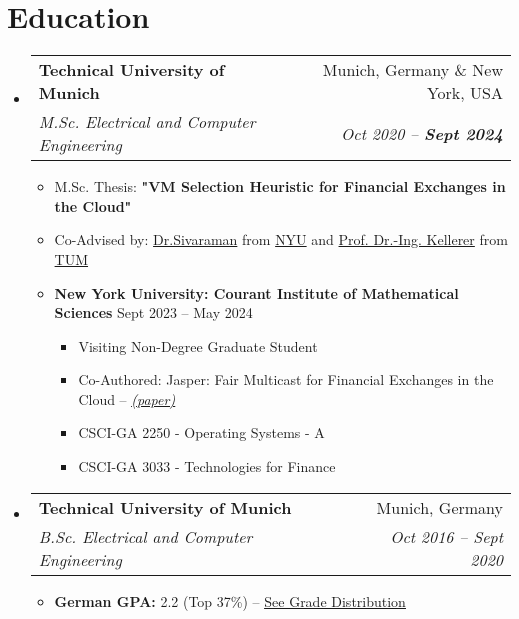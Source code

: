 \documentclass[letterpaper,11pt]{article}
\makeatletter
\newcommand{\resumeItem}[1]{
  \item\small{
    {#1 \vspace{-2pt}}
  }
}
\newcommand{\resumeSubheading}[4]{
  \vspace{-2pt}\item
    \begin{tabular*}{0.97\textwidth}[t]{l@{\extracolsep{\fill}}r}
      \textbf{#1} & #2 \\
      \textit{\small#3} & \textit{\small #4} \\
    \end{tabular*}\vspace{-7pt}
}
\newcommand{\resumeSubHeadingListStart}{\begin{itemize}[leftmargin=0.15in, label={}]}
\newcommand{\resumeSubHeadingListEnd}{\end{itemize}}
\newcommand{\resumeItemListStart}{\begin{itemize}}
\newcommand{\resumeItemListEnd}{\end{itemize}\vspace{-5pt}}
\makeatother
\begin{document}
\section{Education}
  \resumeSubHeadingListStart
    \resumeSubheading
        {Technical University of Munich}{Munich, Germany \& New York, USA}
        {M.Sc. Electrical and Computer Engineering}{Oct 2020 -- \textbf{Sept 2024}}
        \resumeItemListStart
            \vspace{3.0pt}
            \resumeItem{M.Sc. Thesis: \textbf{"VM Selection Heuristic for Financial Exchanges in the Cloud"}}
            \resumeItem{Co-Advised by: \href{https://anirudhsk.github.io/}{Dr.Sivaraman} from \href{https://news.cs.nyu.edu/}{NYU} and \href{https://www.ce.cit.tum.de/en/lkn/team/staff/kellerer-wolfgang/}{Prof. Dr.-Ing. Kellerer} from \href{https://www.ce.cit.tum.de/en/lkn/home/}{TUM}}

            \resumeItem{\textbf{New York University: Courant Institute of Mathematical Sciences} \hfill Sept 2023 -- May 2024}
            \resumeItemListStart
                \resumeItem{Visiting Non-Degree Graduate Student}
                \resumeItem{Co-Authored: Jasper: Fair Multicast for Financial Exchanges in the Cloud -- \href{https://arxiv.org/abs/2402.09527}{\underline{\textit{(paper)}}}}
                \resumeItem{CSCI-GA 2250 - Operating Systems - A}
                \resumeItem{CSCI-GA 3033 - Technologies for Finance}
            \resumeItemListEnd
        \resumeItemListEnd

    \vspace{4.0pt}

    \resumeSubheading
        {Technical University of Munich}{Munich, Germany}
        {B.Sc. Electrical and Computer Engineering}{Oct 2016 -- Sept 2020}
        \resumeItemListStart
            \resumeItem{\textbf{{German GPA: }} 2.2 (Top 37\%) -- \href{https://drive.google.com/file/d/1Xesfn8HF9g4oplwqPZMhcFvGFLuyVzIM/view?usp=sharing}{{\underline{See Grade Distribution}}}}
        \resumeItemListEnd
        
  \resumeSubHeadingListEnd
\end{document}
